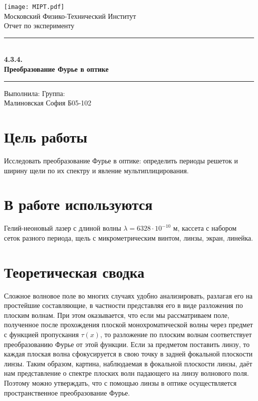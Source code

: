 \documentclass[a4paper,12pt]{article}
\begin{document}
\begin{titlepage}
		\vspace*{\fill}
		
		\begin{center}
			\texttt{[image: MIPT.pdf]}
			\\[0.7cm]\Huge Московский Физико-Технический Институт
			\\[2cm]\LARGE Отчет по эксперименту
			\\[0.5cm]\noindent\rule{\textwidth}{1pt}
			\\\Huge\textbf{4.3.4. \\ Преобразование Фурье в оптике}
			\\[-0.5cm]\noindent\rule{\textwidth}{1pt}
		\end{center}
		
		\vspace*{\fill}
		
		\begin{flushleft}
			Выполнила: \hspace{\fill} Группа:
			\\Малиновская София \hspace{\fill} Б05-102
		\end{flushleft}
	\end{titlepage}

	\setcounter{page}{2}

\section*{Цель работы} 
Исследовать преобразование Фурье в оптике: определить периоды решеток и ширину щели по их спектру и явление мультиплицирования.


\section*{В работе используются} 
Гелий-неоновый лазер с длиной волны $\lambda = 6328 \cdot 10^{-10}$ м, кассета с набором
сеток разного периода, щель с микрометрическим винтом, линзы,
экран, линейка.


\section*{Теоретическая сводка}
Сложное волновое поле во многих случаях удобно анализировать, разлагая его на простейшие составляющие, в частности представляя его в виде разложения по плоским волнам. При этом оказывается, что если мы рассматриваем поле, полученное после прохождения плоской монохроматической волны через предмет с функцией пропускания $\tau(x)$, то разложение по плоским волнам соответствует преобразованию Фурье от этой функции. Если за предметом поставить линзу, то каждая плоская волна сфокусируется в свою точку в задней фокальной плоскости линзы. Таким образом, картина, наблюдаемая в фокальной плоскости линзы, даёт нам представление о спектре плоских волн падающего на линзу волнового поля. Поэтому можно утверждать, что с помощью линзы в оптике осуществляется пространственное преобразование Фурье.
\end{document}
